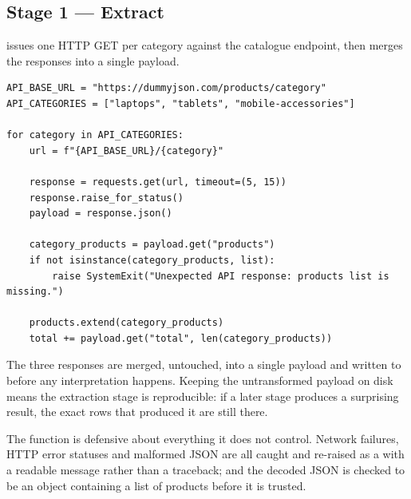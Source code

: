 \begin{center}
\end{center}

\subsection{Stage 1 --- Extract}

 issues one HTTP GET per category
against the catalogue endpoint, then merges the responses into a single
payload.

\begin{codebox}
\noindent
\begin{lstlisting}[style=py]
API_BASE_URL = "https://dummyjson.com/products/category"
API_CATEGORIES = ["laptops", "tablets", "mobile-accessories"]

for category in API_CATEGORIES:
    url = f"{API_BASE_URL}/{category}"

    response = requests.get(url, timeout=(5, 15))
    response.raise_for_status()
    payload = response.json()

    category_products = payload.get("products")
    if not isinstance(category_products, list):
        raise SystemExit("Unexpected API response: products list is missing.")

    products.extend(category_products)
    total += payload.get("total", len(category_products))
\end{lstlisting}
\end{codebox}

The three responses are merged, untouched, into a single payload and written
to  before any interpretation happens.
Keeping the untransformed payload on disk means the extraction stage is
reproducible: if a later stage produces a surprising result, the exact rows
that produced it are still there.

The function is defensive about everything it does not control. Network
failures, HTTP error statuses and malformed JSON are all caught and
re-raised as a  with a readable message rather than a
traceback; and the decoded JSON is checked to be an object containing a
list of products before it is trusted.

